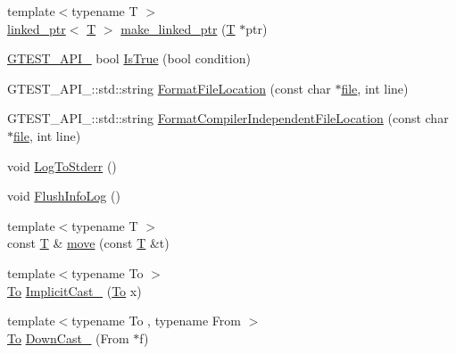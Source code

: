 \begin{DoxyCompactItemize}
\item 
{\footnotesize template$<$typename T $>$ }\\\hyperlink{classtesting_1_1internal_1_1linked__ptr}{linked\+\_\+ptr}$<$ \hyperlink{functions__7_8js_adf1f3edb9115acb0a1e04209b7a9937b}{T} $>$ \hyperlink{namespacetesting_1_1internal_a0d79fad1f772844eff35dfe955f24fd6}{make\+\_\+linked\+\_\+ptr} (\hyperlink{functions__7_8js_adf1f3edb9115acb0a1e04209b7a9937b}{T} $\ast$ptr)
\item 
\hyperlink{gtest-port_8h_aa73be6f0ba4a7456180a94904ce17790}{G\+T\+E\+S\+T\+\_\+\+A\+P\+I\+\_\+} bool \hyperlink{namespacetesting_1_1internal_a527b9bcc13669b9a16400c8514266254}{Is\+True} (bool condition)
\item 
G\+T\+E\+S\+T\+\_\+\+A\+P\+I\+\_\+\+::std\+::string \hyperlink{namespacetesting_1_1internal_a31b7c3abed4a7c395f42c61e993989f4}{Format\+File\+Location} (const char $\ast$\hyperlink{_07copy_08_2_read_camera_model_8m_a151631b2fd2bb776ef06c9f440a7ed74}{file}, int line)
\item 
G\+T\+E\+S\+T\+\_\+\+A\+P\+I\+\_\+\+::std\+::string \hyperlink{namespacetesting_1_1internal_a1ee4cde97868c53e442d3182496a9f3c}{Format\+Compiler\+Independent\+File\+Location} (const char $\ast$\hyperlink{_07copy_08_2_read_camera_model_8m_a151631b2fd2bb776ef06c9f440a7ed74}{file}, int line)
\item 
void \hyperlink{namespacetesting_1_1internal_a06b1b20029fbd1dbeb59752f914fab84}{Log\+To\+Stderr} ()
\item 
void \hyperlink{namespacetesting_1_1internal_a2135f223bf6b527729aeaa651115183b}{Flush\+Info\+Log} ()
\item 
{\footnotesize template$<$typename T $>$ }\\const \hyperlink{functions__7_8js_adf1f3edb9115acb0a1e04209b7a9937b}{T} \& \hyperlink{namespacetesting_1_1internal_a0f6d06bf8c3093b9c22bb08723db201e}{move} (const \hyperlink{functions__7_8js_adf1f3edb9115acb0a1e04209b7a9937b}{T} \&t)
\item 
{\footnotesize template$<$typename To $>$ }\\\hyperlink{classtesting_1_1internal_1_1_to}{To} \hyperlink{namespacetesting_1_1internal_a982df3f369643b175f79cda4048bc3b9}{Implicit\+Cast\+\_\+} (\hyperlink{classtesting_1_1internal_1_1_to}{To} x)
\item 
{\footnotesize template$<$typename To , typename From $>$ }\\\hyperlink{classtesting_1_1internal_1_1_to}{To} \hyperlink{namespacetesting_1_1internal_a1a1a1aed3fe00908b8a45d5ab4a33665}{Down\+Cast\+\_\+} (From $\ast$f)

\end{DoxyCompactItemize}
